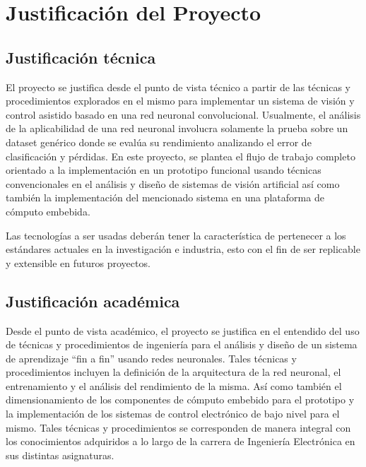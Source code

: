 \documentclass[12pt,letterpaper]{article}
\begin{document}
\section{Justificación del Proyecto}

\subsection{Justificación técnica}

El proyecto se justifica desde el punto de vista técnico a partir de las técnicas y procedimientos explorados 
en el mismo para implementar un sistema de visión y control asistido basado en una red neuronal convolucional. 
Usualmente, el análisis de la aplicabilidad de una red neuronal involucra solamente la prueba sobre un dataset 
genérico donde se evalúa su rendimiento analizando el error de clasificación y pérdidas. En este proyecto, se plantea el 
flujo de trabajo completo orientado a la implementación en un prototipo funcional usando técnicas convencionales en 
el análisis y diseño de sistemas de visión artificial así como también la implementación del mencionado sistema en 
una plataforma de cómputo embebida.

Las tecnologías a ser usadas deberán tener la característica de pertenecer a los estándares actuales en la 
investigación e industria, esto con el fin de ser replicable y extensible en futuros proyectos.

\subsection{Justificación académica}

Desde el punto de vista académico, el proyecto se justifica en el entendido del uso de técnicas y procedimientos 
de ingeniería para el análisis y diseño de un sistema de aprendizaje “fin a fin” usando redes neuronales. Tales 
técnicas y procedimientos incluyen la definición de la arquitectura de la red neuronal, el entrenamiento y el análisis 
del rendimiento de la misma. Así como también el dimensionamiento de los componentes de cómputo embebido para el 
prototipo y la implementación de los sistemas de control electrónico de bajo nivel para el mismo. Tales técnicas y 
procedimientos se corresponden de manera integral con los conocimientos adquiridos a lo largo de la carrera 
de Ingeniería Electrónica en sus distintas asignaturas.

\end{document}
